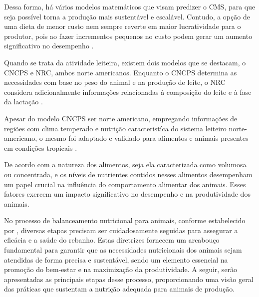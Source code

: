 Dessa forma, há vários modelos matemáticos que visam predizer o \gls{CMS}, para que seja possível torna a produção mais sustentável e escalável. Contudo, a opção de uma dieta de menor custo nem sempre reverte em maior lucratividade para o produtor, pois ao fazer incrementos pequenos no custo podem gerar um aumento significativo no desempenho \cite{Kolln:2014:AvaliacaoSistemaOtimizacaoRacaoVacaLeiteira}.

Quando se trata da atividade leiteira, existem dois modelos que se destacam, o \gls{CNCPS} e \gls{NRC}, ambos norte americanos. Enquanto o \gls{CNCPS} determina as necessidades com base no peso do animal e na produção de leite, o \gls{NRC} considera adicionalmente informações relacionadas à composição do leite e à fase da lactação \cite{Zanin:2017:EquacoesEstimarConsumoVacasLeiteiras}.

Apesar do modelo \gls{CNCPS} ser norte americano, empregando informações de regiões com clima temperado e nutrição caracteristíca do sistema leiteiro norte-americano, o mesmo foi adaptado e validado para alimentos e animais presentes em condições tropicais \cite{Lanna:1999:ModelosLinearesNaoLinearesUsoNutrientes}.

De acordo com  a natureza dos alimentos, seja ela caracterizada como volumosa ou concentrada, e os níveis de nutrientes contidos nesses alimentos desempenham um papel crucial na influência do comportamento alimentar dos animais. Esses fatores exercem um impacto significativo no desempenho e na produtividade dos animais.

No processo de balanceamento nutricional para animais, conforme estabelecido por , diversas etapas precisam ser cuidadosamente seguidas para assegurar a eficácia e a saúde do rebanho. Estas diretrizes fornecem um arcabouço fundamental para garantir que as necessidades nutricionais dos animais sejam atendidas de forma precisa e sustentável, sendo um elemento essencial na promoção do bem-estar e na maximização da produtividade. A seguir, serão apresentadas as principais etapas desse processo, proporcionando uma visão geral das práticas que sustentam a nutrição adequada para animais de produção.

